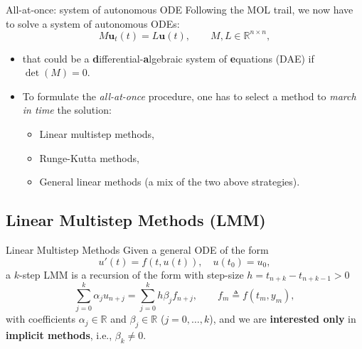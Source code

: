 \documentclass[aspectratio=169,xcolor=dvipsnames]{beamer}
\begin{document}
	\begin{frame}{All-at-once: system of autonomous ODE}
	Following the MOL trail, we now have to solve a \alert{system of autonomous ODEs}:
	\[
	M \mathbf{u}_t(t) = L \mathbf{u}(t), \qquad M,L \in \mathbb{R}^{n \times n}, 
	\]
	\begin{itemize}
		\item[\faHammer] that could be a \textbf{d}ifferential-\textbf{a}lgebraic system of \textbf{e}quations (DAE) if $\det(M) = 0$.
		\item[\faCog]<2-> To formulate the \emph{all-at-once} procedure, one has to select a method to \emph{march in time} the solution:
		\begin{itemize}
			\item[\faWrench]<3-> \normalsize Linear multistep methods,
			\item[\faWrench]<3-> \normalsize Runge-Kutta methods,
			\item[\faWrench]<3-> \normalsize General linear methods (a mix of the two above strategies).
		\end{itemize}
	\end{itemize}
	\end{frame}

	\subsection{Linear Multistep Methods (LMM)}
	
	\begin{frame}{Linear Multistep Methods}
	Given a general ODE of the form
	\[
		u'(t)=f(t,u(t)), \quad u(t_0)=u_0,
	\]
	a $k$-step LMM is a recursion of the form with step-size $h = t_{n+k} - t_{n+k-1} > 0$
	\[
	\sum_{j=0}^k \alpha_j u_{n+j}=\sum_{j=0}^k h \beta_j f_{n+j}, \qquad f_m  \triangleq f(t_m, y_m),
	\]
	with coefficients $\alpha_j\in\mathbb{R}$ and $\beta_j\in \mathbb{R}$ ($j=0, \ldots, k$), and we are \textbf{interested only} in \textbf{implicit methods}, i.e., $\beta_k\ne 0$.\vfill
	
	
	\end{frame}
\end{document}
